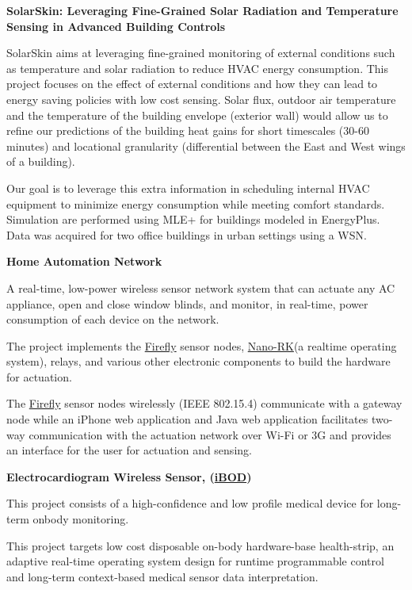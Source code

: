 \documentclass[10pt]{article}
\renewcommand{\section}[2]%
        {\pagebreak[2]\vspace{1.3\baselineskip}%
         \phantomsection\addcontentsline{toc}{section}{#1}%
         \hspace{0in}%
         \marginpar{
         \raggedright \scshape #1}#2}
\newenvironment{innerlist}[1][\enskip\textbullet]%
        {\begin{compactitem}[#1]}{\end{compactitem}}
\begin{document}
\textbf{SolarSkin: Leveraging Fine-Grained Solar Radiation and Temperature Sensing in Advanced Building Controls}
\begin{innerlist}
\item SolarSkin aims at leveraging fine-grained monitoring of external conditions such as temperature and solar radiation to reduce HVAC energy consumption. This project focuses on the effect of external conditions and how they can lead to energy saving policies with low cost sensing. Solar flux, outdoor air temperature and the temperature of the building envelope (exterior wall) would allow us to refine our predictions of the building heat gains for short timescales (30-60 minutes) and locational granularity (differential between the East and West wings of a building). 
\item Our goal is to leverage this extra information in scheduling internal HVAC equipment to minimize energy consumption while meeting comfort standards. Simulation are performed using MLE+ for buildings modeled in EnergyPlus. Data was acquired for two office buildings in urban settings using a WSN.\\ 
\end{innerlist}
\section{Past Projects}
%
\textbf{Home Automation Network}
\begin{innerlist}
\item A real-time, low-power wireless sensor network system that can actuate any AC appliance, open and close window blinds, and monitor, in real-time, power consumption of each device on the network. 
\item The project implements the \href{http://www.nanork.org/wiki/FireFly}{Firefly} sensor nodes, \href{http://www.nanork.org}{Nano-RK}(a realtime operating system), relays, and various other electronic components to build the hardware for actuation. 
\item The \href{http://www.nanork.org/wiki/FireFly}{Firefly} sensor nodes wirelessly (IEEE 802.15.4) communicate with a gateway node while an iPhone web application and Java web application facilitates two-way communication with the actuation network over Wi-Fi or 3G and provides an interface for the user for actuation and sensing. \\
\end{innerlist}

\textbf{Electrocardiogram Wireless Sensor, (\href{http://mlab.seas.upenn.edu/zipcare}{\textbf{iBOD}})}
\begin{innerlist}
\item This project consists of a high-confidence and low profile medical device for long-term onbody monitoring. 
\item This project targets low cost disposable on-body hardware-base health-strip, an adaptive real-time operating system design for runtime programmable control and long-term context-based medical sensor data interpretation. \\
\end{innerlist}
\end{document}
